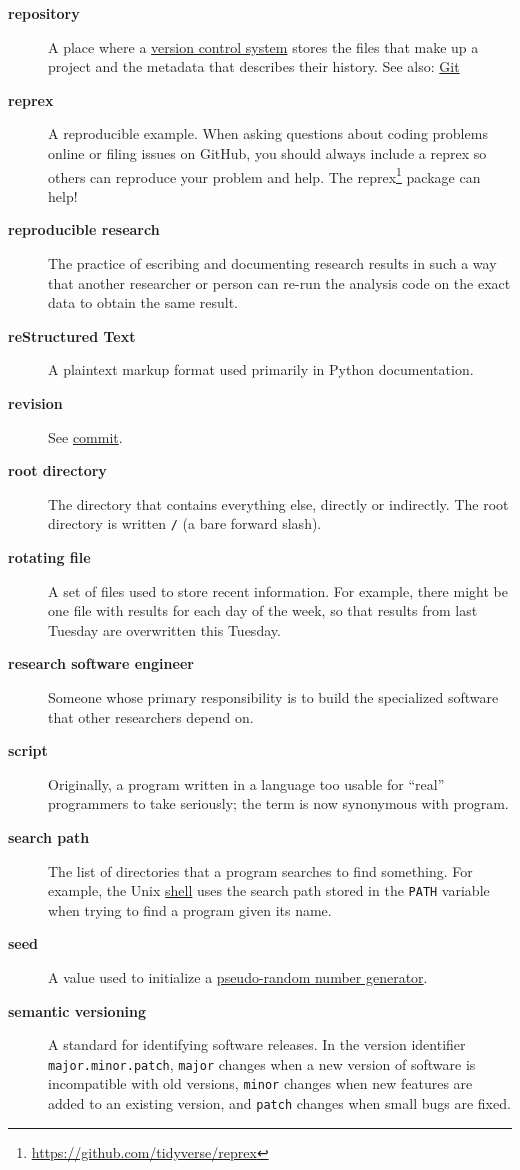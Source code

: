 \documentclass[
]{krantz}
\renewcommand{\href}[2]{#2\footnote{\url{#1}}}
\begin{document}
\begin{description}
\item[\textbf{repository}]
A place where a \protect\hyperlink{version_control_system}{version control system} stores the files that make up a project and the metadata that describes their history. See also: \protect\hyperlink{git}{Git}
\item[\textbf{reprex}]
A reproducible example. When asking questions about coding problems online or filing issues on GitHub, you should always include a reprex so others can reproduce your problem and help. The \href{https://github.com/tidyverse/reprex}{reprex} package can help!
\item[\textbf{reproducible research}]
The practice of escribing and documenting research results in such a way that another researcher or person can re-run the analysis code on the exact data to obtain the same result.
\item[\textbf{reStructured Text}]
A plaintext markup format used primarily in Python documentation.
\item[\textbf{revision}]
See \protect\hyperlink{commit}{commit}.
\item[\textbf{root directory}]
The directory that contains everything else, directly or indirectly. The root directory is written \texttt{/} (a bare forward slash).
\item[\textbf{rotating file}]
A set of files used to store recent information. For example, there might be one file with results for each day of the week, so that results from last Tuesday are overwritten this Tuesday.
\item[\textbf{research software engineer}]
Someone whose primary responsibility is to build the specialized software that other researchers depend on.
\item[\textbf{script}]
Originally, a program written in a language too usable for ``real'' programmers to take seriously; the term is now synonymous with program.
\item[\textbf{search path}]
The list of directories that a program searches to find something. For example, the Unix \protect\hyperlink{shell}{shell} uses the search path stored in the \texttt{PATH} variable when trying to find a program given its name.
\item[\textbf{seed}]
A value used to initialize a \protect\hyperlink{prng}{pseudo-random number generator}.
\item[\textbf{semantic versioning}]
A standard for identifying software releases. In the version identifier \texttt{major.minor.patch}, \texttt{major} changes when a new version of software is incompatible with old versions, \texttt{minor} changes when new features are added to an existing version, and \texttt{patch} changes when small bugs are fixed.

\end{description}
\end{document}

